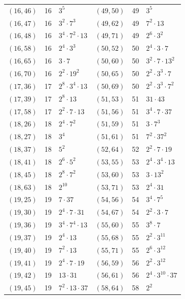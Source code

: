 \documentclass[11pt]{article}
\begin{document}
\begin{longtable}{@{}lrl@{\qquad}lrl@{}}
$(16,46)$ & 16 & $3^{5}$ & $(49,50)$ & 49 & $3^{5}$\\
$(16,47)$ & 16 & $3^{2}\cdot 7^{3}$ & $(49,62)$ & 49 & $7^{2}\cdot 13$\\
$(16,48)$ & 16 & $3^{4}\cdot 7^{2}\cdot 13$ & $(49,71)$ & 49 & $2^{6}\cdot 3^{2}$\\
$(16,58)$ & 16 & $2^{4}\cdot 3^{3}$ & $(50,52)$ & 50 & $2^{4}\cdot 3\cdot 7$\\
$(16,65)$ & 16 & $3\cdot 7$ & $(50,60)$ & 50 & $3^{2}\cdot 7\cdot 13^{2}$\\
$(16,70)$ & 16 & $2^{2}\cdot 19^{2}$ & $(50,65)$ & 50 & $2^{2}\cdot 3^{3}\cdot 7$\\
$(17,36)$ & 17 & $2^{8}\cdot 3^{4}\cdot 13$ & $(50,69)$ & 50 & $2^{2}\cdot 3^{3}\cdot 7^{2}$\\
$(17,39)$ & 17 & $2^{8}\cdot 13$ & $(51,53)$ & 51 & $31\cdot 43$\\
$(17,58)$ & 17 & $2^{2}\cdot 7\cdot 13$ & $(51,56)$ & 51 & $3^{4}\cdot 7\cdot 37$\\
$(18,26)$ & 18 & $2^{4}\cdot 7^{2}$ & $(51,59)$ & 51 & $3\cdot 7^{3}$\\
$(18,27)$ & 18 & $3^{4}$ & $(51,61)$ & 51 & $7^{2}\cdot 37^{2}$\\
$(18,37)$ & 18 & $5^{2}$ & $(52,64)$ & 52 & $2^{2}\cdot 7\cdot 19$\\
$(18,41)$ & 18 & $2^{6}\cdot 5^{2}$ & $(53,55)$ & 53 & $2^{4}\cdot 3^{4}\cdot 13$\\
$(18,45)$ & 18 & $2^{8}\cdot 7^{2}$ & $(53,60)$ & 53 & $3\cdot 13^{2}$\\
$(18,63)$ & 18 & $2^{10}$ & $(53,71)$ & 53 & $2^{4}\cdot 31$\\
$(19,25)$ & 19 & $7\cdot 37$ & $(54,56)$ & 54 & $3^{4}\cdot 7^{5}$\\
$(19,30)$ & 19 & $2^{4}\cdot 7\cdot 31$ & $(54,67)$ & 54 & $2^{2}\cdot 3\cdot 7$\\
$(19,36)$ & 19 & $3^{4}\cdot 7^{4}\cdot 13$ & $(55,60)$ & 55 & $3^{8}\cdot 7$\\
$(19,37)$ & 19 & $2^{4}\cdot 13$ & $(55,68)$ & 55 & $2^{2}\cdot 3^{11}$\\
$(19,40)$ & 19 & $7^{2}\cdot 13$ & $(55,71)$ & 55 & $2^{6}\cdot 3^{12}$\\
$(19,41)$ & 19 & $2^{4}\cdot 7\cdot 19$ & $(56,59)$ & 56 & $2^{2}\cdot 3^{12}$\\
$(19,42)$ & 19 & $13\cdot 31$ & $(56,61)$ & 56 & $2^{4}\cdot 3^{10}\cdot 37$\\
$(19,45)$ & 19 & $7^{2}\cdot 13\cdot 37$ & $(58,64)$ & 58 & $2^{2}$\\

\end{longtable}
\end{document}
